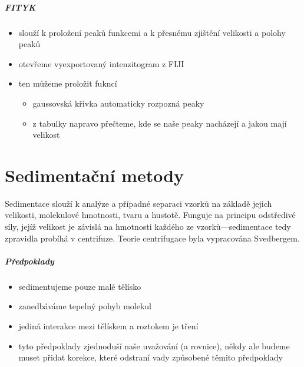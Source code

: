 \documentclass[DIV=8]{scrreprt}
\begin{document}
\paragraph{FITYK}
\begin{itemize}[nosep]
    \item slouží k proložení peaků funkcemi a k přesnému zjištění velikosti a polohy peaků
    \item otevřeme vyexportovaný intenzitogram z FIJI
    \item ten můžeme proložit fukncí
\begin{itemize}[nosep]
    \item gaussovská křivka automaticky rozpozná peaky
    \item z tabulky napravo přečteme, kde se naše peaky nacházejí a jakou mají velikost
\end{itemize}

\end{itemize}



\chapter{Sedimentační metody} \label{Sedimentační metody}


Sedimentace slouží k analýze a případné separaci vzorků na základě jejich velikosti, molekulové hmotnosti, tvaru a hustotě. Funguje na principu odstředivé síly, jejíž velikost je závislá na hmotnosti každého ze vzorků---sedimentace tedy zpravidla probíhá v centrifuze. Teorie centrifugace byla vypracována Svedbergem.

\paragraph{Předpoklady}
\begin{itemize}[nosep]
    \item sedimentujeme pouze malé tělísko
    \item zanedbáváme tepelný pohyb molekul
    \item jediná interakce mezi tělískem a roztokem je tření
    \item tyto předpoklady zjednoduší naše uvažování (a rovnice), někdy ale budeme muset přidat korekce, které odstraní vady způsobené těmito předpoklady
\end{itemize}
\end{document}
